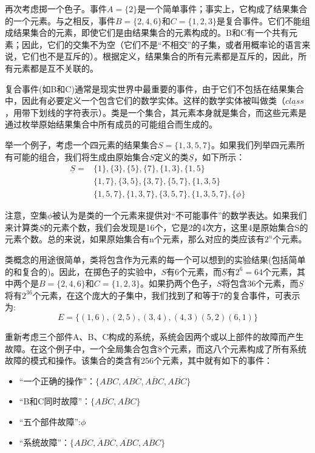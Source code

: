 \documentclass[cn,11pt,chinese]{elegantbook}
\begin{document}
 再次考虑掷一个色子。事件$A=\{2\}$是一个简单事件；事实上，它构成了结果集合的一个元素。与之相反，事件$B=\{2,4,6\}$和$C=\{1,2,3\}$是复合事件。它们不能组成结果集合的元素，即使它们是由结果集合的元素构成的。B和C有一个共有元素；因此，它们的交集不为空（它们不是“不相交”的子集，或者用概率论的语言来说，它们也不是互斥的）。根据定义，结果集合的所有元素都是互斥的，因此，所有元素都是互不关联的。
 
 复合事件(如B和C)通常是现实世界中最重要的事件，由于它们不包括在结果集合中，因此有必要定义一个包含它们的数学实体。这样的数学实体被叫做类（$\underline{class}$，用带下划线的字符表示）。类是一个集合，其元素本身就是集合，而这些元素是通过枚举原始结果集合中所有成员的可能组合而生成的。
 
 举一个例子，考虑一个四元素的结果集合$S=\{1,3,5,7\}$。如果我们列举四元素所有可能的组合，我们将生成由原始集合$S$定义的类$\underline{S} $，如下所示：
 \begin{align*}
 	\underline{S} =& \{1\},\{3\},\{5\},\{7\},\{1,3\},\{1,5\} \\
 	&\{1,7\},\{3,5\},\{3,7\},\{5,7\},\{1,3,5\} \\
 	&\{1,5,7\},\{1,3,7\},\{3,5,7\},\{1,3,5,7\},\{\phi\}
 \end{align*}
 
 注意，空集$\phi$被认为是类的一个元素来提供对“不可能事件”的数学表达。如果我们来计算类$\underline{S}$的元素个数，我们会发现是16个，它是2的4次方，这里4是原始集合S的元素个数。总的来说，如果原始集合有n个元素，那么对应的类应该有$2^n$个元素。
 
 类概念的用途很简单，类将包含作为元素的每一个可以想到的实验结果(包括简单的和复合的)。因此，在掷色子的实验中，$S$有6个元素，而$\underline{S}$有$2^6=64$个元素，其中两个是$B=\{2,4,6\}$和$C=\{1,2,3\}$。如果扔两个色子，$S$将包含36个元素，而$\underline{S}$将有$2^{36}$个元素，在这个庞大的子集中，我们找到了和等于7的复合事件，可表示为:
 $$E=\{(1,6),(2,5),(3,4),(4,3)(5,2)(6,1)\}$$
 
 重新考虑三个部件A、B、C构成的系统，系统会因两个或以上部件的故障而产生故障。在这个例子中，一个全局集合包含8个元素，而这八个元素构成了所有系统故障的模式和操作。该集合的类含有256个元素，其中就有如下的事件：
 
 \begin{itemize}
 \item  “一个正确的操作”：$\{ABC,AB\overline{C},A\overline{B}C,A\overline{BC}\}$
 \item  “B和C同时故障”：$\{A\overline{BC},\overline{ABC}\}$
 \item  “五个部件故障”:$\phi$
 \item  “系统故障”：$\{A\overline{BC},\overline{A}B\overline{C},\overline{AB}C,\overline{ABC}\}$
 \end{itemize}
\end{document}
